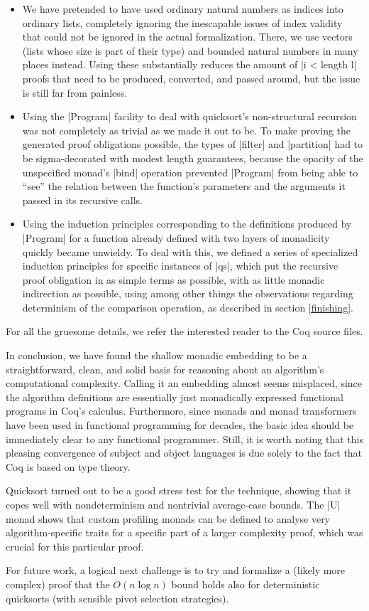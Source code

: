 \documentclass[runningheads]{llncs}
\begin{document}
\begin{itemize}
\item We have pretended to have used ordinary natural numbers as indices into ordinary lists, completely ignoring the inescapable issues of index validity that could not be ignored in the actual formalization. There, we use vectors (lists whose size is part of their type) and bounded natural numbers in many places instead. Using these substantially reduces the amount of |i < length l| proofs that need to be produced, converted, and passed around, but the issue is still far from painless.
\item Using the |Program| facility to deal with quicksort's non-structural recursion was not completely as trivial as we made it out to be. To make proving the generated proof obligations possible, the types of |filter| and |partition| had to be sigma-decorated with modest length guarantees, because the opacity of the unspecified monad's |bind| operation prevented |Program| from being able to ``see'' the relation between the function's parameters and the arguments it passed in its recursive calls.
\item Using the induction principles corresponding to the definitions produced by |Program| for a function already defined with two layers of monadicity quickly became unwieldy. To deal with this, we defined a series of specialized induction principles for specific instances of |qs|, which put the recursive proof obligation in as simple terms as possible, with as little monadic indirection as possible, using among other things the observations regarding determinism of the comparison operation, as described in section \ref{finishing}.
\end{itemize}

For all the gruesome details, we refer the interested reader to the Coq source files.

In conclusion, we have found the shallow monadic embedding to be a straightforward, clean, and solid basis for reasoning about an algorithm's computational complexity. Calling it an embedding almost seems misplaced, since the algorithm definitions are essentially just monadically expressed functional programs in Coq's calculus. Furthermore, since monads and monad transformers have been used in functional programming for decades, the basic idea should be immediately clear to any functional programmer. Still, it is worth noting that this pleasing convergence of subject and object languages is due solely to the fact that Coq is based on type theory.

Quicksort turned out to be a good stress test for the technique, showing that it copes well with nondeterminism and nontrivial average-case bounds. The |U| monad shows that custom profiling monads can be defined to analyse very algorithm-specific traits for a specific part of a larger complexity proof, which was crucial for this particular proof.

For future work, a logical next challenge is to try and formalize a (likely more complex) proof that the $O(n \log n)$ bound holds also for deterministic quicksorts (with sensible pivot selection strategies).



\end{document}
